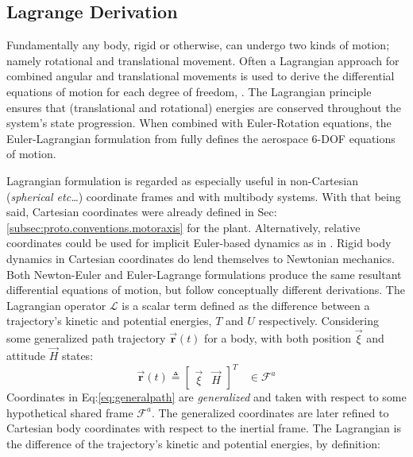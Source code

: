 \subsection{Lagrange Derivation}
\label{subsec:dynamics.rigidbody.lagrange}
Fundamentally any body, rigid or otherwise, can undergo two kinds of motion; namely rotational and translational movement. Often a Lagrangian approach for combined angular and translational movements is used to derive the differential equations of motion for each degree of freedom, \cite{classicaldynamics}. The Lagrangian principle ensures that (translational and rotational) energies are conserved throughout the system's state progression. When combined with Euler-Rotation equations, the Euler-Lagrangian formulation from \cite{lagrange-formalism} fully defines the aerospace 6-DOF equations of motion.
\par
Lagrangian formulation is regarded as especially useful in non-Cartesian (\emph{spherical etc\ldots}) coordinate frames and with multibody systems. With that being said, Cartesian coordinates were already defined in Sec:\ref{subsec:proto.conventions.motoraxis} for the plant. Alternatively, relative coordinates could be used for implicit Euler-based dynamics as in \cite{autonomousrobotseuler}. Rigid body dynamics in Cartesian coordinates do lend themselves to Newtonian mechanics. Both Newton-Euler and Euler-Lagrange formulations produce the same resultant differential equations of motion, but follow conceptually different derivations. The Lagrangian operator $\mathcal{L}$ is a scalar term defined as the difference between a trajectory's kinetic and potential energies, $T$ and $U$ respectively. Considering some generalized path trajectory $\vec{\mathbf{r}}(t)$ for a body, with both position $\vec{\xi}$ and attitude $\vec{H}$ states:
\begin{equation}\label{eq:generalpath}
\vec{\mathbf{r}}(t)\triangleq\begin{bmatrix}
\vec{\xi} & \vec{H}
\end{bmatrix}^T~~~~\in\mathcal{F}^{a}
\end{equation}
Coordinates in Eq:\ref{eq:generalpath} are \emph{generalized} and taken with respect to some hypothetical shared frame $\mathcal{F}^{a}$. The generalized coordinates are later refined to Cartesian body coordinates with respect to the inertial frame. The Lagrangian is the difference of the trajectory's kinetic and potential energies, by definition:
